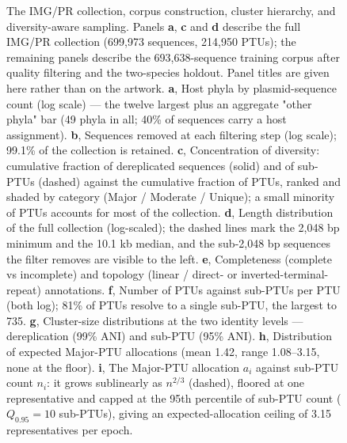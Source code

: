 \begin{figure}[h]
    \centering
\caption{
The IMG/PR collection, corpus construction, cluster hierarchy, and diversity-aware sampling. Panels \textbf{a}, \textbf{c} and \textbf{d} describe the full IMG/PR collection (699,973 sequences, 214,950 PTUs); the remaining panels describe the 693,638-sequence training corpus after quality filtering and the two-species holdout. Panel titles are given here rather than on the artwork. \textbf{a}, Host phyla by plasmid-sequence count (log scale) --- the twelve largest plus an aggregate "other phyla" bar (49 phyla in all; 40\% of sequences carry a host assignment). \textbf{b}, Sequences removed at each filtering step (log scale); 99.1\% of the collection is retained. \textbf{c}, Concentration of diversity: cumulative fraction of dereplicated sequences (solid) and of sub-PTUs (dashed) against the cumulative fraction of PTUs, ranked and shaded by category (Major / Moderate / Unique); a small minority of PTUs accounts for most of the collection. \textbf{d}, Length distribution of the full collection (log-scaled); the dashed lines mark the 2,048 bp minimum and the 10.1 kb median, and the sub-2,048 bp sequences the filter removes are visible to the left. \textbf{e}, Completeness (complete vs incomplete) and topology (linear / direct- or inverted-terminal-repeat) annotations. \textbf{f}, Number of PTUs against sub-PTUs per PTU (both log); 81\% of PTUs resolve to a single sub-PTU, the largest to 735. \textbf{g}, Cluster-size distributions at the two identity levels --- dereplication (99\% ANI) and sub-PTU (95\% ANI). \textbf{h}, Distribution of expected Major-PTU allocations (mean 1.42, range 1.08--3.15, none at the floor). \textbf{i}, The Major-PTU allocation $a_i$ against sub-PTU count $n_i$: it grows sublinearly as $n^{2/3}$ (dashed), floored at one representative and capped at the 95th percentile of sub-PTU count ($Q_{0.95} = 10$ sub-PTUs), giving an expected-allocation ceiling of 3.15 representatives per epoch.
}
\label{fig:ed-corpus}
\end{figure}

